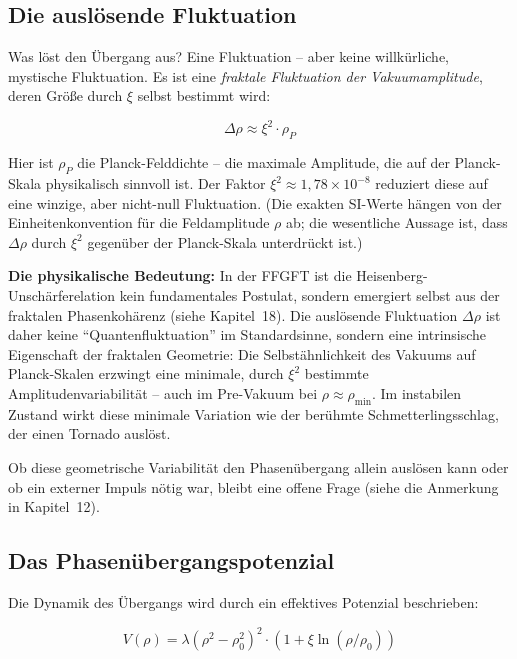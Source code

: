 	\subsection{Die auslösende Fluktuation}
	
	Was löst den Übergang aus? Eine Fluktuation -- aber keine willkürliche, mystische Fluktuation. Es ist eine \textit{fraktale Fluktuation der Vakuumamplitude}, deren Größe durch $\xi$ selbst bestimmt wird:
	
	\begin{equation}
		\Delta\rho \approx \xi^2 \cdot \rho_P
	\end{equation}
	
	Hier ist $\rho_P$ die Planck-Felddichte -- die maximale Amplitude, die auf der Planck-Skala physikalisch sinnvoll ist. Der Faktor $\xi^2 \approx 1{,}78 \times 10^{-8}$ reduziert diese auf eine winzige, aber nicht-null Fluktuation. (Die exakten SI-Werte hängen von der Einheitenkonvention für die Feldamplitude $\rho$ ab; die wesentliche Aussage ist, dass $\Delta\rho$ durch $\xi^2$ gegenüber der Planck-Skala unterdrückt ist.)
	
	\textbf{Die physikalische Bedeutung:} In der FFGFT ist die Heisenberg-Unschärferelation kein fundamentales Postulat, sondern emergiert selbst aus der fraktalen Phasenkohärenz (siehe Kapitel~18). Die auslösende Fluktuation $\Delta\rho$ ist daher keine \enquote{Quantenfluktuation} im Standardsinne, sondern eine intrinsische Eigenschaft der fraktalen Geometrie: Die Selbstähnlichkeit des Vakuums auf Planck-Skalen erzwingt eine minimale, durch $\xi^2$ bestimmte Amplitudenvariabilität -- auch im Pre-Vakuum bei $\rho \approx \rho_{\min}$. Im instabilen Zustand wirkt diese minimale Variation wie der berühmte Schmetterlingsschlag, der einen Tornado auslöst.
	
	Ob diese geometrische Variabilität den Phasenübergang allein auslösen kann oder ob ein externer Impuls nötig war, bleibt eine offene Frage (siehe die Anmerkung in Kapitel~12).
	
	\subsection{Das Phasenübergangspotenzial}
	
	Die Dynamik des Übergangs wird durch ein effektives Potenzial beschrieben:
	
	\begin{equation}
		V(\rho) = \lambda (\rho^2 - \rho_0^2)^2 \cdot \left(1 + \xi \ln(\rho/\rho_0)\right)
	\end{equation}
	
